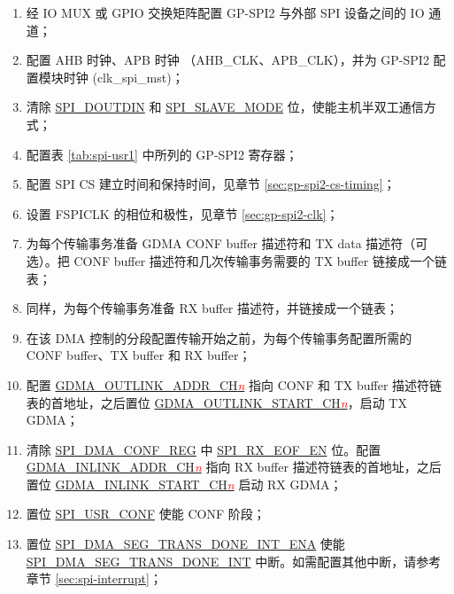 \documentclass[main\_\_CN.tex]{subfiles}
\begin{document}
 \begin{enumerate}
    \item 经 IO MUX 或 GPIO 交换矩阵配置 GP-SPI2 与外部 SPI 设备之间的 IO 通道；
    \item 配置 AHB 时钟、APB 时钟 （AHB\_CLK、APB\_CLK），并为 GP-SPI2 配置模块时钟 (clk\_spi\_mst)；

    \item 清除 \hyperref[fielddesc:SPIDOUTDIN]{SPI\_DOUTDIN} 和 \hyperref[fielddesc:SPISLAVEMODE]{SPI\_SLAVE\_MODE} 位，使能主机半双工通信方式；

    \item 配置表 \ref{tab:spi-usr1} 中所列的 GP-SPI2 寄存器；

    \item 配置 SPI CS 建立时间和保持时间，见章节  \ref{sec:gp-spi2-cs-timing}；

    \item 设置 FSPICLK 的相位和极性，见章节  \ref{sec:gp-spi2-clk}；

   \item 为每个传输事务准备 GDMA CONF buffer 描述符和 TX data 描述符（可选）。把 CONF buffer 描述符和几次传输事务需要的 TX buffer 链接成一个链表；

   \item 同样，为每个传输事务准备 RX buffer 描述符，并链接成一个链表；
   \item 在该 DMA 控制的分段配置传输开始之前，为每个传输事务配置所需的 CONF buffer、TX buffer 和 RX buffer；

   \item 配置 \hyperref[fielddesc:GDMAOUTLINKADDRCHN]{GDMA\_OUTLINK\_ADDR\_CH\textcolor{red}{\it{n}}}  指向 CONF 和 TX buffer 描述符链表的首地址，之后置位 \hyperref[fielddesc:GDMAOUTLINKSTARTCHN]{GDMA\_OUTLINK\_START\_CH\textcolor{red}{\it{n}}}，启动 TX GDMA；

   \item 清除 \hyperref[regdesc:SPIDMACONFREG]{SPI\_DMA\_CONF\_REG} 中 \hyperref[fielddesc:SPIRXEOFEN]{SPI\_RX\_EOF\_EN} 位。配置 \hyperref[fielddesc:GDMAINLINKADDRCHN]{GDMA\_INLINK\_ADDR\_CH\textcolor{red}{\it{n}}}  指向 RX buffer 描述符链表的首地址，之后置位 \hyperref[fielddesc:GDMAINLINKSTARTCHN]{GDMA\_INLINK\_START\_CH\textcolor{red}{\it{n}}}  启动 RX GDMA；

   \item 置位 \hyperref[fielddesc:SPIUSRCONF]{SPI\_USR\_CONF} 使能 CONF 阶段；
   \item 置位 \hyperref[fielddesc:SPIDMASEGTRANSDONEINTENA]{SPI\_DMA\_SEG\_TRANS\_DONE\_INT\_ENA} 使能 \hyperref[int:SPIDMASEGTRANSDONEINT]{SPI\_DMA\_SEG\_TRANS\_DONE\_INT} 中断。如需配置其他中断，请参考章节  \ref{sec:spi-interrupt}；


\end{enumerate}
\end{document}
